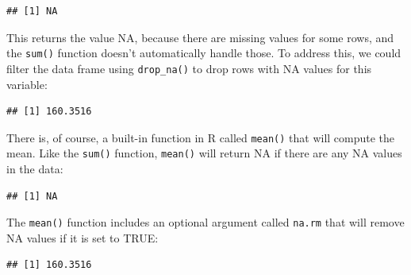 \documentclass[12pt,]{book}
\newenvironment{Shaded}{\begin{snugshade}}{\end{snugshade}}
\newcommand{\DataTypeTok}[1]{\textcolor[rgb]{0.13,0.29,0.53}{#1}}
\newcommand{\KeywordTok}[1]{\textcolor[rgb]{0.13,0.29,0.53}{\textbf{#1}}}
\newcommand{\NormalTok}[1]{#1}
\newcommand{\OperatorTok}[1]{\textcolor[rgb]{0.81,0.36,0.00}{\textbf{#1}}}
\newcommand{\OtherTok}[1]{\textcolor[rgb]{0.56,0.35,0.01}{#1}}
\newcommand{\StringTok}[1]{\textcolor[rgb]{0.31,0.60,0.02}{#1}}
\begin{document}
\begin{verbatim}
## [1] NA
\end{verbatim}

This returns the value NA, because there are missing values for some rows, and the \texttt{sum()} function doesn't automatically handle those. To address this, we could filter the data frame using \texttt{drop\_na()} to drop rows with NA values for this variable:

\begin{Shaded}
\end{Shaded}

\begin{verbatim}
## [1] 160.3516
\end{verbatim}

There is, of course, a built-in function in R called \texttt{mean()} that will compute the mean. Like the \texttt{sum()} function, \texttt{mean()} will return NA if there are any NA values in the data:

\begin{Shaded}
\end{Shaded}

\begin{verbatim}
## [1] NA
\end{verbatim}

The \texttt{mean()} function includes an optional argument called \texttt{na.rm} that will remove NA values if it is set to TRUE:

\begin{Shaded}
\end{Shaded}

\begin{verbatim}
## [1] 160.3516
\end{verbatim}
\end{document}
